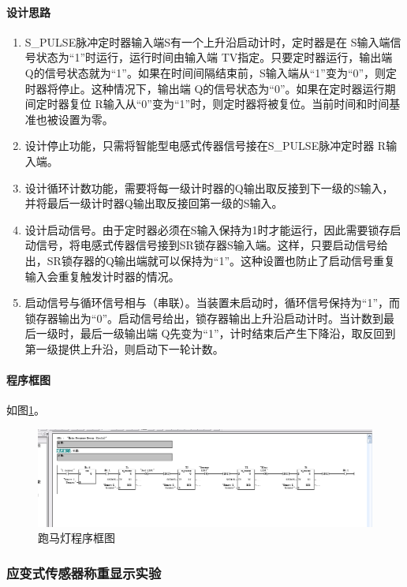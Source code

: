 \paragraph{设计思路}
\begin{enumerate}
\item {\ttfamily S\_PULSE}脉冲定时器输入端S有一个上升沿启动计时，定时器是在 S输入端信号状态为“1”时运行，运行时间由输入端 TV指定。只要定时器运行，输出端 Q的信号状态就为“1”。如果在时间间隔结束前，S输入端从“1”变为“0”，则定时器将停止。这种情况下，输出端 Q的信号状态为“0”。如果在定时器运行期间定时器复位 R输入从“0”变为“1”时，则定时器将被复位。当前时间和时间基准也被设置为零。
\item 设计停止功能，只需将智能型电感式传器信号接在{\ttfamily S\_PULSE}脉冲定时器 R输入端。
\item 设计循环计数功能，需要将每一级计时器的Q输出取反接到下一级的S输入，并将最后一级计时器Q输出取反接回第一级的S输入。
\item 设计启动信号。由于定时器必须在S输入保持为1时才能运行，因此需要锁存启动信号，将电感式传器信号接到SR锁存器S输入端。这样，只要启动信号给出，SR锁存器的Q输出端就可以保持为“1”。这种设置也防止了启动信号重复输入会重复触发计时器的情况。
\item 启动信号与循环信号相与（串联）。当装置未启动时，循环信号保持为“1”，而锁存器输出为“0”。启动信号给出，锁存器输出上升沿启动计时。当计数到最后一级时，最后一级输出端 Q先变为“1”，计时结束后产生下降沿，取反回到第一级提供上升沿，则启动下一轮计数。
\end{enumerate}

\paragraph{程序框图} 如图\ref{fig:horse}。

\begin{figure}[htbp]
\centering
\includegraphics[width=16cm]{resource/program_horse.png}
\caption{跑马灯程序框图}
\label{fig:horse}
\end{figure}

\subsubsection{应变式传感器称重显示实验}
